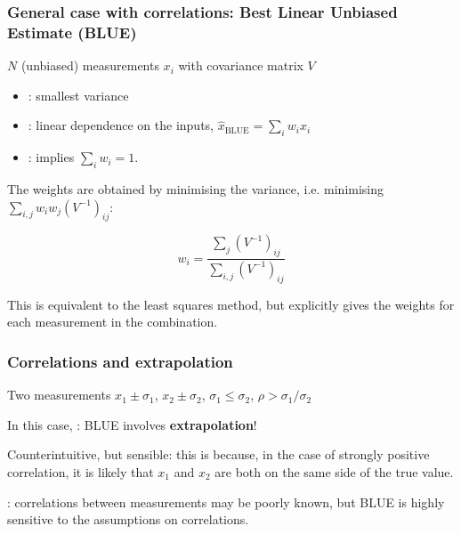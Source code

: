 \documentclass[9pt]{beamer}
\begin{document}
\begin{frame}
 \frametitle{General case with correlations: Best Linear Unbiased Estimate (BLUE)}
 
 $N$ (unbiased) measurements $x_i$ with covariance matrix $V$
 
 \begin{itemize}
  \item {}: smallest variance
  \item {}: linear dependence on the inputs, $\hat{x}_\text{BLUE} = \sum_i w_i x_i$
  \item {}: implies $\sum_i w_i = 1$.
 \end{itemize}
 
 The weights are obtained by minimising the variance, i.e. minimising $\sum_{i,j} w_i w_j \left(V^{-1}\right)_{ij}$:
 
 $$w_i = \frac{\sum_{j} \left(V^{-1}\right)_{ij}}{\sum_{i,j} \left(V^{-1}\right)_{ij}}$$
 
 This is equivalent to the least squares method, but explicitly gives the weights for each measurement in the combination.

\end{frame}

\begin{frame}
 \frametitle{Correlations and extrapolation}
 
 Two measurements $x_1 \pm \sigma_1$, $x_2 \pm \sigma_2$, $\sigma_1 \leq \sigma_2$, $\rho > \sigma_1 / \sigma_2$
 
 In this case, : BLUE involves \textbf{extrapolation}!
 
 Counterintuitive, but sensible: this is because, in the case of strongly positive correlation, it is likely that $x_1$ and $x_2$ are both on the same side of the true value.
 
 : correlations between measurements may be poorly known, but BLUE is highly sensitive to the assumptions on correlations.
\end{frame}
\end{document}
